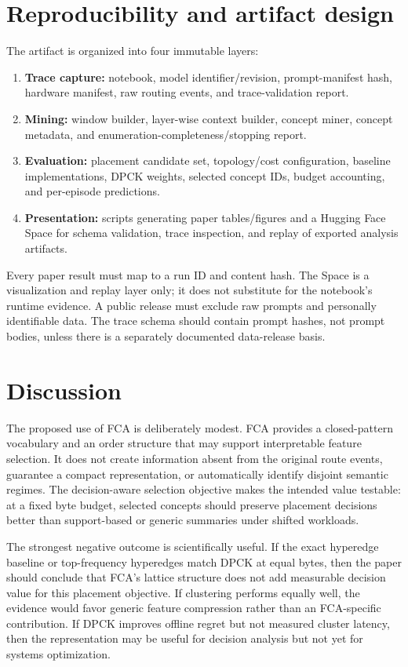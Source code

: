 \documentclass[a4paper,preprint,review,12pt,authoryear]{elsarticle}
\begin{document}
\section{Reproducibility and artifact design}
\label{sec:artifact}

The artifact is organized into four immutable layers:
\begin{enumerate}[leftmargin=*]
  \item \textbf{Trace capture:} notebook, model identifier/revision, prompt-manifest hash, hardware manifest, raw routing events, and trace-validation report.
  \item \textbf{Mining:} window builder, layer-wise context builder, concept miner, concept metadata, and enumeration-completeness/stopping report.
  \item \textbf{Evaluation:} placement candidate set, topology/cost configuration, baseline implementations, DPCK weights, selected concept IDs, budget accounting, and per-episode predictions.
  \item \textbf{Presentation:} scripts generating paper tables/figures and a Hugging Face Space for schema validation, trace inspection, and replay of exported analysis artifacts.
\end{enumerate}

Every paper result must map to a run ID and content hash. The Space is a visualization and replay layer only; it does not substitute for the notebook's runtime evidence. A public release must exclude raw prompts and personally identifiable data. The trace schema should contain prompt hashes, not prompt bodies, unless there is a separately documented data-release basis.

\section{Discussion}

The proposed use of FCA is deliberately modest. FCA provides a closed-pattern vocabulary and an order structure that may support interpretable feature selection. It does not create information absent from the original route events, guarantee a compact representation, or automatically identify disjoint semantic regimes. The decision-aware selection objective makes the intended value testable: at a fixed byte budget, selected concepts should preserve placement decisions better than support-based or generic summaries under shifted workloads.

The strongest negative outcome is scientifically useful. If the exact hyperedge baseline or top-frequency hyperedges match DPCK at equal bytes, then the paper should conclude that FCA's lattice structure does not add measurable decision value for this placement objective. If clustering performs equally well, the evidence would favor generic feature compression rather than an FCA-specific contribution. If DPCK improves offline regret but not measured cluster latency, then the representation may be useful for decision analysis but not yet for systems optimization.
\end{document}
